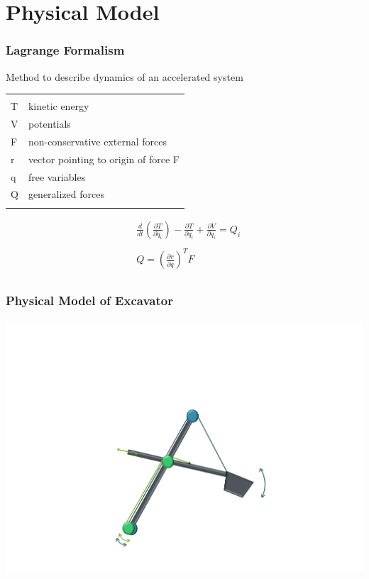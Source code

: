 \section{Physical Model}

\begin{frame}
	\frametitle{Lagrange Formalism}
	
	Method to describe dynamics of an accelerated system\\
	\begin{small}
	\begin{tabular}{ll}
		 & \\
		T & kinetic energy\\
		V & potentials\\
		F & non-conservative external forces\\
		r & vector pointing to origin of force F\\ %
		q & free variables\\
		Q & generalized forces\\ \\
	\end{tabular}
	\end{small}
	\begin{align*}
	&\frac{d}{dt}\left(\frac{\partial T}{\partial \dot{q}_i}\right) -
	\frac{\partial T}{\partial q_i} +
	\frac{\partial V}{\partial q_i}
	= Q_i \\ \\
	& Q = \left(\frac{\partial r}{\partial q}\right)^T F\\
	\end{align*}
		
\end{frame}	

\begin{frame}
	\frametitle{Physical Model of Excavator}
	
	\includegraphics[trim=22cm 5cm 2cm 23cm, clip=true, width=\linewidth]{img/Excavator_Only}
	
\end{frame}

